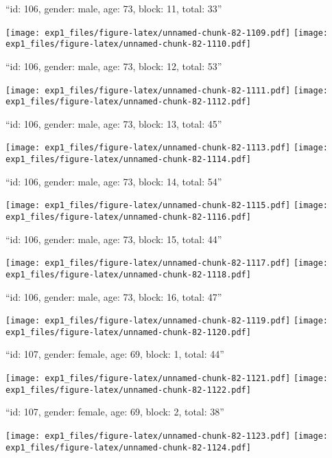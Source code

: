 \documentclass[11pt,,]{article}
\begin{document}
\newpage
[1] 

``id: 106, gender: male, age: 73, block: 11, total: 33''

\texttt{[image: exp1\_files/figure-latex/unnamed-chunk-82-1109.pdf]}
\texttt{[image: exp1\_files/figure-latex/unnamed-chunk-82-1110.pdf]}

\newpage
[1] 

``id: 106, gender: male, age: 73, block: 12, total: 53''

\texttt{[image: exp1\_files/figure-latex/unnamed-chunk-82-1111.pdf]}
\texttt{[image: exp1\_files/figure-latex/unnamed-chunk-82-1112.pdf]}

\newpage
[1] 

``id: 106, gender: male, age: 73, block: 13, total: 45''

\texttt{[image: exp1\_files/figure-latex/unnamed-chunk-82-1113.pdf]}
\texttt{[image: exp1\_files/figure-latex/unnamed-chunk-82-1114.pdf]}

\newpage
[1] 

``id: 106, gender: male, age: 73, block: 14, total: 54''

\texttt{[image: exp1\_files/figure-latex/unnamed-chunk-82-1115.pdf]}
\texttt{[image: exp1\_files/figure-latex/unnamed-chunk-82-1116.pdf]}

\newpage
[1] 

``id: 106, gender: male, age: 73, block: 15, total: 44''

\texttt{[image: exp1\_files/figure-latex/unnamed-chunk-82-1117.pdf]}
\texttt{[image: exp1\_files/figure-latex/unnamed-chunk-82-1118.pdf]}

\newpage
[1] 

``id: 106, gender: male, age: 73, block: 16, total: 47''

\texttt{[image: exp1\_files/figure-latex/unnamed-chunk-82-1119.pdf]}
\texttt{[image: exp1\_files/figure-latex/unnamed-chunk-82-1120.pdf]}

\newpage
[1] 

``id: 107, gender: female, age: 69, block: 1, total: 44''

\texttt{[image: exp1\_files/figure-latex/unnamed-chunk-82-1121.pdf]}
\texttt{[image: exp1\_files/figure-latex/unnamed-chunk-82-1122.pdf]}

\newpage
[1] 

``id: 107, gender: female, age: 69, block: 2, total: 38''

\texttt{[image: exp1\_files/figure-latex/unnamed-chunk-82-1123.pdf]}
\texttt{[image: exp1\_files/figure-latex/unnamed-chunk-82-1124.pdf]}
\end{document}
